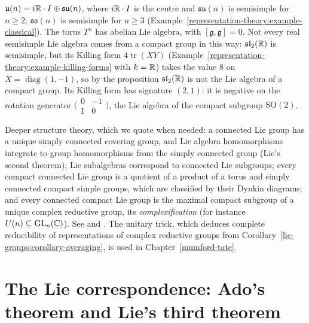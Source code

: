 \begin{example}\label{lie-groups:example-compact-semisimple}
$\mathfrak{u}(n) = i\mathbb{R}\cdot I \oplus \mathfrak{su}(n)$, where $i\mathbb{R} \cdot I$ is the centre and $\mathfrak{su}(n)$ is semisimple for $n \geq 2$; $\mathfrak{so}(n)$ is semisimple for $n \geq 3$
(Example~\ref{representation-theory:example-classical}). The torus $T^n$ has abelian Lie algebra, with $[\mathfrak{g}, \mathfrak{g}] = 0$. Not every real semisimple Lie algebra comes from a
compact group in this way: $\mathfrak{sl}_2(\mathbb{R})$ is semisimple, but its Killing form $4\operatorname{tr}(XY)$ (Example~\ref{representation-theory:example-killing-forms}
with $k = \mathbb{R}$) takes the value $8$ on $X = \operatorname{diag}(1, -1)$, so by the proposition $\mathfrak{sl}_2(\mathbb{R})$ is not the Lie algebra of a
compact group. Its Killing form has signature $(2, 1)$: it is negative on the rotation generator $\bigl(\begin{smallmatrix}0 & -1\\ 1 & 0\end{smallmatrix}\bigr)$, the Lie algebra of the
compact subgroup $\mathrm{SO}(2)$.
\end{example}
\begin{remark}\label{lie-groups:remark-structure}
Deeper structure theory, which we quote when needed: a connected Lie group has a unique simply connected covering group, and Lie algebra homomorphisms integrate to group homomorphisms from the simply
connected group (Lie's second theorem); Lie subalgebras correspond to connected Lie subgroups; every compact connected Lie group is a quotient of a product of a torus and simply connected compact simple
groups, which are classified by their Dynkin diagrams; and every connected compact Lie group is the maximal compact subgroup of a unique complex reductive group, its \emph{complexification} (for instance
$U(n) \subseteq \mathrm{GL}_n(\mathbb{C})$). See \cite{knapp-lie} and \cite{brocker-tomdieck}. The unitary trick, which deduces complete reducibility of representations of complex reductive groups from
Corollary~\ref{lie-groups:corollary-averaging}, is used in Chapter~\ref{mumford-tate}.
\end{remark}

\section{The Lie correspondence: Ado's theorem and Lie's third theorem}\label{lie-groups:section-correspondence}

